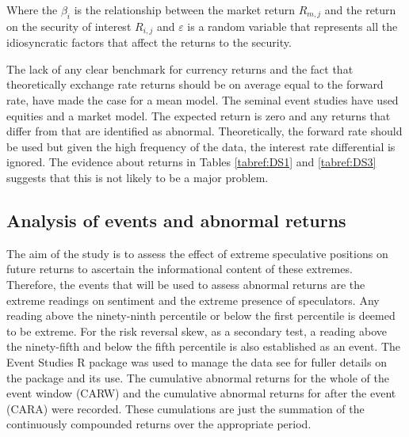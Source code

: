 \documentclass[12pt, a4paper, oneside]{article} %
\begin{document}
Where the $\beta_i$ is the relationship between the market return $R_{m, j}$ and the return on the security of interest $R_{i, j}$ and $\varepsilon$ is a random variable that represents all the idiosyncratic factors that affect the returns to the security. 

The lack of any clear benchmark for currency returns and the fact that theoretically exchange rate returns should be on average equal to the forward rate, have made the case for a mean model.  The seminal event studies have used equities and a market model.  The expected return is zero and any returns that differ from that are identified as abnormal. Theoretically, the forward rate should be used but given the high frequency of the data, the interest rate differential is ignored.   The evidence about returns in Tables \ref{tabref:DS1} and \ref{tabref:DS3} suggests that this is not likely to be a major problem.    

\subsection{Analysis of events and abnormal returns}
The aim of the study is to assess the effect of extreme speculative positions on future returns to ascertain the informational content of these extremes.  Therefore, the events that will be used to assess abnormal returns are the extreme readings on sentiment and the extreme presence of speculators.   Any reading above the ninety-ninth percentile or below the first percentile is deemed to be extreme.  For the risk reversal skew, as a secondary test, a reading above the ninety-fifth and below the fifth percentile is also established as an event.   The Event Studies R package was used to manage the data see \citep{eventstudies} for fuller details on the package and its use.  The cumulative abnormal returns for the whole of the event window (CARW) and the cumulative abnormal returns for after the event (CARA) were recorded.  These cumulations are just the summation of the continuously compounded returns over the appropriate period. 
\end{document}

